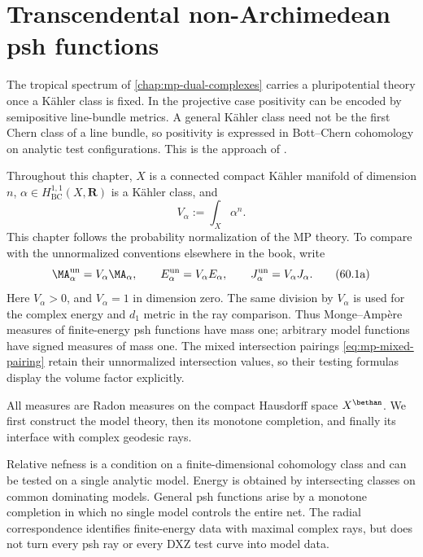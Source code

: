 \chapter{Transcendental non-Archimedean psh functions}
\label{chap:mp-psh}

The tropical spectrum of \cref{chap:mp-dual-complexes} carries a
pluripotential theory once a K\"ahler class is fixed. In the projective
case positivity can be encoded by semipositive line-bundle metrics.
A general K\"ahler class need not be the first Chern class of a line
bundle, so positivity is expressed in Bott--Chern cohomology on
analytic test configurations. This is the approach of
\cite[Section~4.1]{MPTropicalV2}.

Throughout this chapter, $X$ is a connected compact K\"ahler manifold
of dimension $n$, $\alpha\in H^{1,1}_{\mathrm{BC}}(X,\mathbf R)$
is a K\"ahler class, and
\[
                         V_\alpha:=\int_X\alpha^n.
\tag{60.1}\label{eq:mp-volume}
\]
This chapter follows the probability normalization of the MP theory.
To compare with the unnormalized conventions elsewhere in the book, write
\[
 \MA_\alpha^{\mathrm{un}}=V_\alpha\MA_\alpha,
 \qquad E_\alpha^{\mathrm{un}}=V_\alpha E_\alpha,
 \qquad J_\alpha^{\mathrm{un}}=V_\alpha J_\alpha.
\tag{60.1a}\label{eq:mp-probability-conversion}
\]
Here $V_\alpha>0$, and $V_\alpha=1$ in dimension zero.
The same division by $V_\alpha$ is used for the complex energy and
$d_1$ metric in the ray comparison. Thus Monge--Amp\`ere measures of
finite-energy psh functions have mass one; arbitrary model functions
have signed measures of mass one. The mixed intersection pairings
\eqref{eq:mp-mixed-pairing} retain their unnormalized intersection
values, so their testing formulas display the volume factor explicitly.

All measures are Radon measures on the compact Hausdorff space
$X^{\bethan}$. We first construct the model theory, then its
monotone completion, and finally its interface with complex
geodesic rays.

Relative nefness is a condition on a finite-dimensional cohomology
class and can be tested on a single analytic model. Energy is
obtained by intersecting classes on common dominating models.
General psh functions arise by a monotone completion in which no
single model controls the entire net. The radial correspondence
identifies finite-energy data with maximal complex rays, but does
not turn every psh ray or every DXZ test curve into model data.


